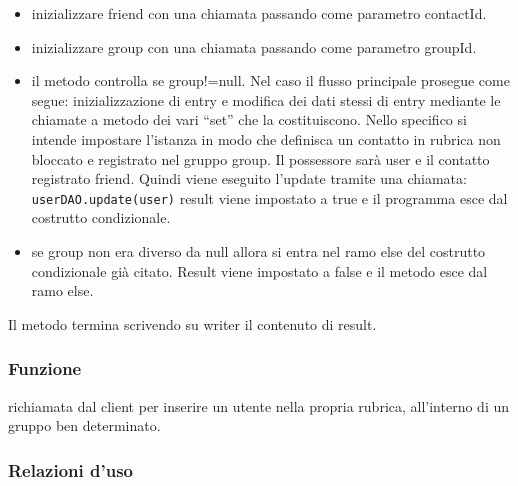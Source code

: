 \begin{description}
\begin{itemize}
		\item inizializzare friend con una chiamata  passando come parametro contactId.
		\item inizializzare group con una chiamata  passando come parametro groupId.
		\item il metodo controlla se group!=null. Nel caso il flusso principale prosegue come segue: inizializzazione di entry e modifica dei dati stessi di entry mediante le chiamate a metodo dei vari ``set'' che la costituiscono. Nello specifico si intende impostare l'istanza in modo che definisca un contatto in rubrica non bloccato e registrato nel gruppo group. Il possessore sarà user e il contatto registrato friend. Quindi viene eseguito l'update tramite una chiamata:\\
		\verb|userDAO.update(user)|
		result viene impostato a true e il programma esce dal costrutto condizionale.
		\item se group non era diverso da null allora si entra nel ramo else del costrutto condizionale già citato. Result viene impostato a false e il metodo esce dal ramo else.
	\end{itemize}
	Il metodo termina scrivendo su writer il contenuto di result.
	
\end{description}



\subsubsection*{Funzione}
 richiamata dal client per inserire un utente nella propria rubrica, all'interno di un gruppo ben determinato.

\subsubsection*{Relazioni d'uso}

